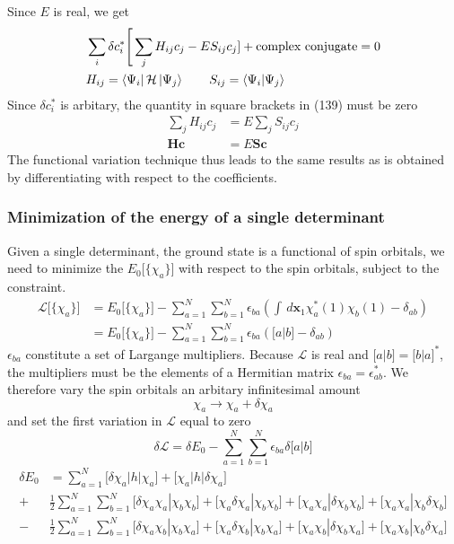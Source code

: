 \documentclass[11pt]{article}
\begin{document}
Since $E$ is real, we get
\begin{align}
    &\sum_{i}\delta c_i^*\Bigg[\sum_{j}H_{ij}c_j-ES_{ij}c_j]+\text{complex conjugate}=0\\
    &H_{ij}=\bra{\Psi_i}\mathcal{H}\ket{\Psi_j}\qquad S_{ij}=\braket{\Psi_i|\Psi_j}\notag\\
\end{align}    
Since $\delta c_i^*$ is arbitary, the quantity in square brackets in (139) must be zero
\begin{align}
    \sum_{j}H_{ij}c_j&=E\sum_{j}S_{ij}c_j\\
    \mathbf{Hc}&=E\mathbf{Sc}
\end{align}
The functional variation technique thus leads to the same results as is obtained by differentiating with respect to the coefficients.
\subsubsection{Minimization of the energy of a single determinant}
Given a single determinant, the ground state is a functional of spin orbitals, we need to minimize the $E_0\big[\{\chi_a\}\big]$ with
respect to the spin orbitals, subject to the constraint.
\begin{equation}
    \begin{split}
        \mathcal{L}\big[\{\chi_a\}\big]&=E_0\big[\{\chi_a\}\big]-\sum_{a=1}^{N}\sum_{b=1}^{N}\epsilon_{ba}(\int\,d\mathbf{x}_1\chi_a^*(1)\chi_b(1)-\delta_{ab})\\
        &=E_0\big[\{\chi_a\}\big]-\sum_{a=1}^{N}\sum_{b=1}^{N}\epsilon_{ba}(\big[a|b\big]-\delta_{ab})
    \end{split}
\end{equation}
$\epsilon_{ba}$ constitute a set of Largange multipliers. Because $\mathcal{L}$ is real and $\big[a|b\big]={\big[b|a\big]}^*$, the multipliers
must be the elements of a Hermitian matrix $\epsilon_{ba}=\epsilon_{ab}^*$. We therefore vary the spin orbitals an arbitary infinitesimal amount
\begin{equation}
    \chi_a\rightarrow\chi_a+\delta\chi_a
\end{equation}
and set the first variation in $\mathcal{L}$ equal to zero
\begin{equation}
    \delta\mathcal{L}=\delta E_0-\sum_{a=1}^{N}\sum_{b=1}^{N}\epsilon_{ba}\delta\big[a|b\big]
\end{equation}
\begin{equation}
    \begin{split}
        \delta E_0&=\sum_{a=1}^{N}\big[\delta\chi_a|h|\chi_a\big]+\big[\chi_a|h|\delta\chi_a\big]\\
        +&\frac{1}{2}\sum_{a=1}^{N}\sum_{b=1}^{N}\big[\delta\chi_a\chi_a|\chi_b\chi_b\big]+\big[\chi_a\delta\chi_a|\chi_b\chi_b\big]+\big[\chi_a\chi_a|\delta\chi_b\chi_b\big]+\big[\chi_a\chi_a|\chi_b\delta\chi_b\big]\\
        -&\frac{1}{2}\sum_{a=1}^{N}\sum_{b=1}^{N}\big[\delta\chi_a\chi_b|\chi_b\chi_a\big]+\big[\chi_a\delta\chi_b|\chi_b\chi_a\big]+\big[\chi_a\chi_b|\delta\chi_b\chi_a\big]+\big[\chi_a\chi_b|\chi_b\delta\chi_a\big]
    \end{split}
\end{equation}
\end{document}
